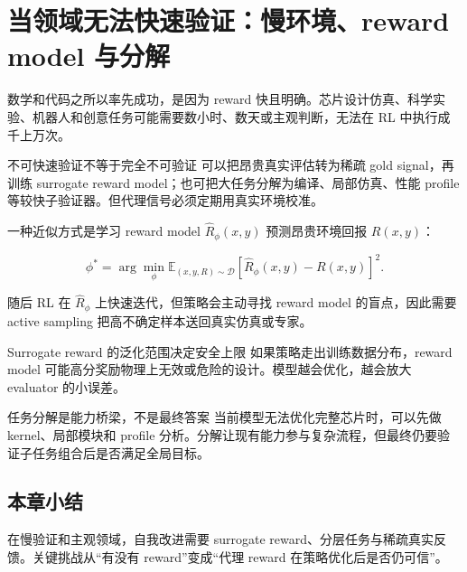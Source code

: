 \section{当领域无法快速验证：慢环境、reward model 与分解}


数学和代码之所以率先成功，是因为 reward 快且明确。芯片设计仿真、科学实验、机器人和创意任务可能需要数小时、数天或主观判断，无法在 RL 中执行成千上万次。

\begin{importantbox}{不可快速验证不等于完全不可验证}
可以把昂贵真实评估转为稀疏 gold signal，再训练 surrogate reward model；也可把大任务分解为编译、局部仿真、性能 profile 等较快子验证器。但代理信号必须定期用真实环境校准。
\end{importantbox}

一种近似方式是学习 reward model $\hat R_\phi(x,y)$ 预测昂贵环境回报 $R(x,y)$：

$$
\phi^*=\arg\min_\phi
\mathbb E_{(x,y,R)\sim \mathcal D}
\left[\hat R_\phi(x,y)-R(x,y)\right]^2.
$$

随后 RL 在 $\hat R_\phi$ 上快速迭代，但策略会主动寻找 reward model 的盲点，因此需要 active sampling 把高不确定样本送回真实仿真或专家。

\begin{warningbox}{Surrogate reward 的泛化范围决定安全上限}
如果策略走出训练数据分布，reward model 可能高分奖励物理上无效或危险的设计。模型越会优化，越会放大 evaluator 的小误差。
\end{warningbox}

\begin{knowledgebox}{任务分解是能力桥梁，不是最终答案}
当前模型无法优化完整芯片时，可以先做 kernel、局部模块和 profile 分析。分解让现有能力参与复杂流程，但最终仍要验证子任务组合后是否满足全局目标。
\end{knowledgebox}

\subsection{本章小结}

在慢验证和主观领域，自我改进需要 surrogate reward、分层任务与稀疏真实反馈。关键挑战从“有没有 reward”变成“代理 reward 在策略优化后是否仍可信”。

